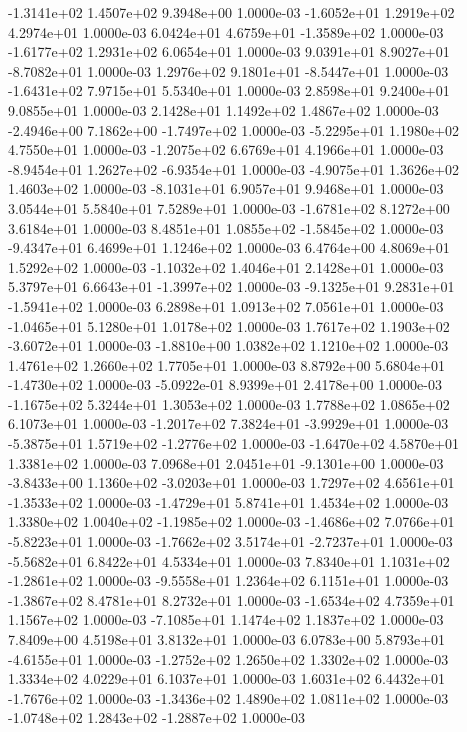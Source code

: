 -1.3141e+02  1.4507e+02  9.3948e+00  1.0000e-03
-1.6052e+01  1.2919e+02  4.2974e+01  1.0000e-03
 6.0424e+01  4.6759e+01 -1.3589e+02  1.0000e-03
-1.6177e+02  1.2931e+02  6.0654e+01  1.0000e-03
 9.0391e+01  8.9027e+01 -8.7082e+01  1.0000e-03
 1.2976e+02  9.1801e+01 -8.5447e+01  1.0000e-03
-1.6431e+02  7.9715e+01  5.5340e+01  1.0000e-03
2.8598e+01 9.2400e+01 9.0855e+01  1.0000e-03
2.1428e+01 1.1492e+02 1.4867e+02  1.0000e-03
-2.4946e+00  7.1862e+00 -1.7497e+02  1.0000e-03
-5.2295e+01  1.1980e+02  4.7550e+01  1.0000e-03
-1.2075e+02  6.6769e+01  4.1966e+01  1.0000e-03
-8.9454e+01  1.2627e+02 -6.9354e+01  1.0000e-03
-4.9075e+01  1.3626e+02  1.4603e+02  1.0000e-03
-8.1031e+01  6.9057e+01  9.9468e+01  1.0000e-03
3.0544e+01 5.5840e+01 7.5289e+01  1.0000e-03
-1.6781e+02  8.1272e+00  3.6184e+01  1.0000e-03
 8.4851e+01  1.0855e+02 -1.5845e+02  1.0000e-03
-9.4347e+01  6.4699e+01  1.1246e+02  1.0000e-03
6.4764e+00 4.8069e+01 1.5292e+02  1.0000e-03
-1.1032e+02  1.4046e+01  2.1428e+01  1.0000e-03
 5.3797e+01  6.6643e+01 -1.3997e+02  1.0000e-03
-9.1325e+01  9.2831e+01 -1.5941e+02  1.0000e-03
6.2898e+01 1.0913e+02 7.0561e+01  1.0000e-03
-1.0465e+01  5.1280e+01  1.0178e+02  1.0000e-03
 1.7617e+02  1.1903e+02 -3.6072e+01  1.0000e-03
-1.8810e+00  1.0382e+02  1.1210e+02  1.0000e-03
1.4761e+02 1.2660e+02 1.7705e+01  1.0000e-03
 8.8792e+00  5.6804e+01 -1.4730e+02  1.0000e-03
-5.0922e-01  8.9399e+01  2.4178e+00  1.0000e-03
-1.1675e+02  5.3244e+01  1.3053e+02  1.0000e-03
1.7788e+02 1.0865e+02 6.1073e+01  1.0000e-03
-1.2017e+02  7.3824e+01 -3.9929e+01  1.0000e-03
-5.3875e+01  1.5719e+02 -1.2776e+02  1.0000e-03
-1.6470e+02  4.5870e+01  1.3381e+02  1.0000e-03
 7.0968e+01  2.0451e+01 -9.1301e+00  1.0000e-03
-3.8433e+00  1.1360e+02 -3.0203e+01  1.0000e-03
 1.7297e+02  4.6561e+01 -1.3533e+02  1.0000e-03
-1.4729e+01  5.8741e+01  1.4534e+02  1.0000e-03
 1.3380e+02  1.0040e+02 -1.1985e+02  1.0000e-03
-1.4686e+02  7.0766e+01 -5.8223e+01  1.0000e-03
-1.7662e+02  3.5174e+01 -2.7237e+01  1.0000e-03
-5.5682e+01  6.8422e+01  4.5334e+01  1.0000e-03
 7.8340e+01  1.1031e+02 -1.2861e+02  1.0000e-03
-9.5558e+01  1.2364e+02  6.1151e+01  1.0000e-03
-1.3867e+02  8.4781e+01  8.2732e+01  1.0000e-03
-1.6534e+02  4.7359e+01  1.1567e+02  1.0000e-03
-7.1085e+01  1.1474e+02  1.1837e+02  1.0000e-03
7.8409e+00 4.5198e+01 3.8132e+01  1.0000e-03
 6.0783e+00  5.8793e+01 -4.6155e+01  1.0000e-03
-1.2752e+02  1.2650e+02  1.3302e+02  1.0000e-03
1.3334e+02 4.0229e+01 6.1037e+01  1.0000e-03
 1.6031e+02  6.4432e+01 -1.7676e+02  1.0000e-03
-1.3436e+02  1.4890e+02  1.0811e+02  1.0000e-03
-1.0748e+02  1.2843e+02 -1.2887e+02  1.0000e-03
